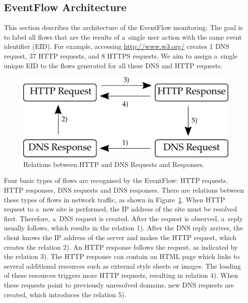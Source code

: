 \subsection{EventFlow Architecture} \label{subsec:eventflow-architecture}

This section describes the architecture of the EventFlow monitoring. The goal is to label all flows that are the results of a~single user action with the same event identifier (EID). For example, accessing \url{http://www.w3.org/} creates 1 DNS request, 37 HTTP requests, and 8 HTTPS requests. We aim to assign a~single unique EID to the flows generated for all these DNS and HTTP requests.

\begin{figure}[!tb]
    \centering 
    \includegraphics{figures/paper-eventflow/dependencies}
    \caption{Relations between HTTP and DNS Requests and Responses.}
    \label{fig:eventflow-relations}
\end{figure}

Four basic types of flows are recognised by the EventFlow: HTTP requests, HTTP responses, DNS requests and DNS responses. There are relations between these types of flows in network traffic, as shown in Figure~\ref{fig:eventflow-relations}. When HTTP request to a~new site is performed, the IP address of the site must be resolved first. Therefore, a~DNS request is created. After the request is observed, a~reply usually follows, which results in the relation 1). After the DNS reply arrives, the client knows the IP address of the server and makes the HTTP request, which creates the relation 2). An HTTP response follows the request, as indicated by the relation 3). The HTTP response can contain an HTML page which links to several additional resources such as external style sheets or images. The loading of these resources triggers more HTTP requests, resulting in relation 4). When these requests point to previously unresolved domains, new DNS requests are created, which introduces the relation 5).

